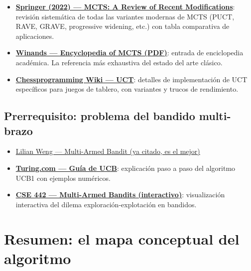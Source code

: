 \documentclass[12pt, a4paper]{article}
\begin{document}
\begin{itemize}
  \item \href{https://link.springer.com/article/10.1007/s10462-022-10228-y}%
    {\textbf{Springer (2022) — MCTS: A Review of Recent Modifications}}: revisión
    sistemática de todas las variantes modernas de MCTS (PUCT, RAVE, GRAVE,
    progressive widening, etc.) con tabla comparativa de aplicaciones.

  \item \href{https://dke.maastrichtuniversity.nl/m.winands/documents/Encyclopedia_MCTS.pdf}%
    {\textbf{Winands — Encyclopedia of MCTS (PDF)}}: entrada de enciclopedia
    académica. La referencia más exhaustiva del estado del arte clásico.

  \item \href{https://www.chessprogramming.org/UCT}%
    {\textbf{Chessprogramming Wiki — UCT}}: detalles de implementación de UCT
    específicos para juegos de tablero, con variantes y trucos de rendimiento.
\end{itemize}

\subsection*{Prerrequisito: problema del bandido multi-brazo}

\begin{itemize}
  \item \href{https://lilianweng.github.io/posts/2018-01-23-multi-armed-bandit/}%
    {Lilian Weng — Multi-Armed Bandit (ya citado, es el mejor)}

  \item \href{https://www.turing.com/kb/guide-on-upper-confidence-bound-algorithm-in-reinforced-learning}%
    {\textbf{Turing.com — Guía de UCB}}: explicación paso a paso del algoritmo
    UCB1 con ejemplos numéricos.

  \item \href{https://cse442-17f.github.io/LinUCB/}%
    {\textbf{CSE 442 — Multi-Armed Bandits (interactivo)}}: visualización
    interactiva del dilema exploración-explotación en bandidos.
\end{itemize}

\section{Resumen: el mapa conceptual del algoritmo}
\end{document}
